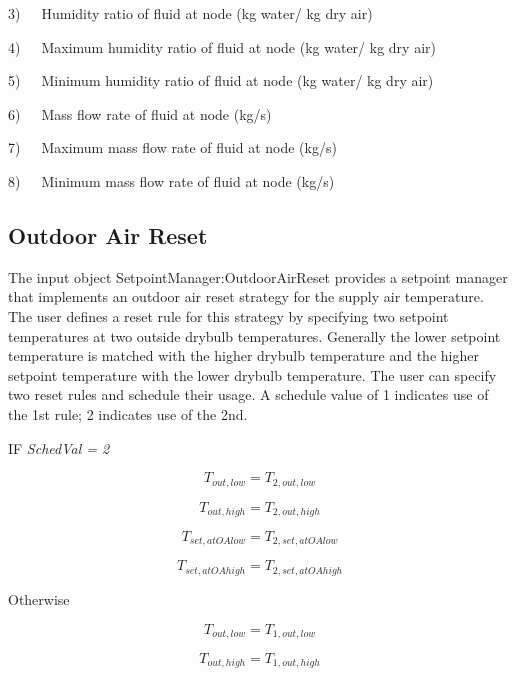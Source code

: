 3)~~~Humidity ratio of fluid at node (kg water/ kg dry air)

4)~~~Maximum humidity ratio of fluid at node (kg water/ kg dry air)

5)~~~Minimum humidity ratio of fluid at node (kg water/ kg dry air)

6)~~~Mass flow rate of fluid at node (kg/s)

7)~~~Maximum mass flow rate of fluid at node (kg/s)

8)~~~Minimum mass flow rate of fluid at node (kg/s)

\subsection{Outdoor Air Reset}\label{outdoor-air-reset}

The input object SetpointManager:OutdoorAirReset provides a setpoint manager that implements an outdoor air reset strategy for the supply air temperature. The user defines a reset rule for this strategy by specifying two setpoint temperatures at two outside drybulb temperatures. Generally the lower setpoint temperature is matched with the higher drybulb temperature and the higher setpoint temperature with the lower drybulb temperature. The user can specify two reset rules and schedule their usage. A schedule value of 1 indicates use of the 1st rule; 2 indicates use of the 2nd.

IF \emph{SchedVal = 2}

\begin{equation}
{T_{out,low}} = {T_{2,out,low}}
\end{equation}

\begin{equation}
{T_{out,high}} = {T_{2,out,high}}
\end{equation}

\begin{equation}
{T_{set,atOAlow}} = {T_{2,set,atOAlow}}
\end{equation}

\begin{equation}
{T_{set,atOAhigh}} = {T_{2,set,atOAhigh}}
\end{equation}

Otherwise

\begin{equation}
{T_{out,low}} = {T_{1,out,low}}
\end{equation}

\begin{equation}
{T_{out,high}} = {T_{1,out,high}}
\end{equation}

